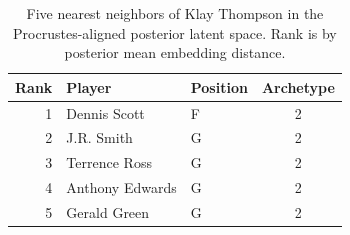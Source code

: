 \begin{table}[htbp]
  \centering\small
  \begin{tabular}{rllc}
    \toprule
    Rank & Player & Position & Archetype \\
    \midrule
    1 & Dennis Scott & F & 2 \\
    2 & J.R. Smith & G & 2 \\
    3 & Terrence Ross & G & 2 \\
    4 & Anthony Edwards & G & 2 \\
    5 & Gerald Green & G & 2 \\
    \bottomrule
  \end{tabular}
  \caption{Five nearest neighbors of Klay Thompson in the Procrustes-aligned posterior latent space. Rank is by posterior mean embedding distance.}
  \label{tab:Klay_Thompson_neighbors}
\end{table}

